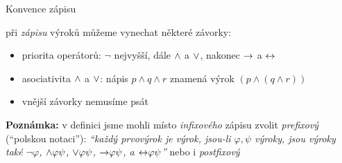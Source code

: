 \documentclass{beamer}
\begin{document}
\begin{frame}{Konvence zápisu}
    
    při \emph{zápisu} výroků můžeme vynechat některé závorky:


    \pause
    \begin{itemize}
        \item priorita operátorů: $\neg$ nejvyšší, dále ${\land}$ a ${\lor}$, nakonec ${\mathbin{\rightarrow}}$ a ${\mathbin{\leftrightarrow}}$
        \item asociativita ${\land}$ a ${\lor}$: nápis $p\land q\land r$ znamená výrok $(p\land (q\land r))$
        \item vnější závorky nemusíme psát
    \end{itemize}

    \pause
    \textbf{Poznámka:} v definici jsme mohli místo \emph{infixového} zápisu zvolit \emph{prefixový} (``polskou notaci''):
    {\it ``každý prvovýrok je výrok, jsou-li $\varphi,\psi$ výroky, jsou výroky také $\neg \varphi$, ${\land} \varphi \psi$, ${\lor} \varphi \psi$, ${\mathbin{\rightarrow}} \varphi \psi$, a ${\mathbin{\leftrightarrow}} \varphi \psi$''} nebo i \emph{postfixový}
    

    \pause
    \medskip

\end{frame}
\end{document}
